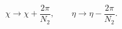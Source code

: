 \begin{equation}
\chi \to \chi + \frac{2 \pi}{N_2}, \qquad \eta \to \eta - \frac{2 \pi}{N_2}.
\end{equation}

